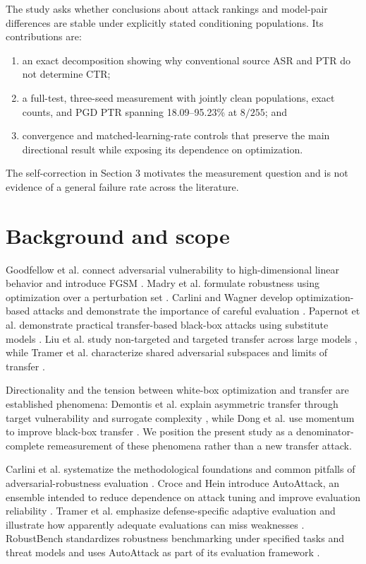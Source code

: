 \documentclass[10pt,twocolumn]{article}
\begin{document}
The study asks whether conclusions about attack rankings and model-pair differences are stable under explicitly stated conditioning populations. Its contributions are:
\begin{enumerate}
\item an exact decomposition showing why conventional source ASR and PTR do not determine CTR;
\item a full-test, three-seed measurement with jointly clean populations, exact counts, and PGD PTR spanning 18.09--95.23\% at $8/255$; and
\item convergence and matched-learning-rate controls that preserve the main directional result while exposing its dependence on optimization.
\end{enumerate}
The self-correction in Section 3 motivates the measurement question and is not evidence of a general failure rate across the literature.

\section{Background and scope}
Goodfellow et al. connect adversarial vulnerability to high-dimensional linear behavior and introduce FGSM \cite{goodfellow}. Madry et al. formulate robustness using optimization over a perturbation set \cite{madry}. Carlini and Wagner develop optimization-based attacks and demonstrate the importance of careful evaluation \cite{carlini}. Papernot et al. demonstrate practical transfer-based black-box attacks using substitute models \cite{papernot}. Liu et al. study non-targeted and targeted transfer across large models \cite{liu}, while Tramer et al. characterize shared adversarial subspaces and limits of transfer \cite{tramerspace}.

Directionality and the tension between white-box optimization and transfer are established phenomena: Demontis et al. explain asymmetric transfer through target vulnerability and surrogate complexity \cite{demontis}, while Dong et al. use momentum to improve black-box transfer \cite{dong}. We position the present study as a denominator-complete remeasurement of these phenomena rather than a new transfer attack.

Carlini et al. systematize the methodological foundations and common pitfalls of adversarial-robustness evaluation \cite{carlini2019}. Croce and Hein introduce AutoAttack, an ensemble intended to reduce dependence on attack tuning and improve evaluation reliability \cite{croce2020}. Tramer et al. emphasize defense-specific adaptive evaluation and illustrate how apparently adequate evaluations can miss weaknesses \cite{tramer2020}. RobustBench standardizes robustness benchmarking under specified tasks and threat models and uses AutoAttack as part of its evaluation framework \cite{robustbench}.
\end{document}
